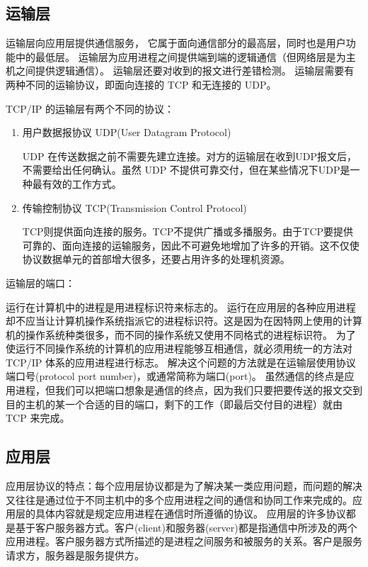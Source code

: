 \subsection{运输层}

运输层向应用层提供通信服务，
它属于面向通信部分的最高层，同时也是用户功能中的最低层。
运输层为应用进程之间提供端到端的逻辑通信（但网络层是为主机之间提供逻辑通信）。
运输层还要对收到的报文进行差错检测。
运输层需要有两种不同的运输协议，即面向连接的 TCP 和无连接的 UDP。

TCP/IP 的运输层有两个不同的协议：

\begin{enumerate}
  \item 用户数据报协议 UDP(User Datagram Protocol)

UDP 在传送数据之前不需要先建立连接。对方的运输层在收到UDP报文后，不需要给出任何确认。虽然 UDP 不提供可靠交付，但在某些情况下UDP是一种最有效的工作方式。



  \item 传输控制协议 TCP(Transmission Control Protocol)

TCP则提供面向连接的服务。TCP不提供广播或多播服务。由于TCP要提供可靠的、面向连接的运输服务，因此不可避免地增加了许多的开销。这不仅使协议数据单元的首部增大很多，还要占用许多的处理机资源。

\end{enumerate}




运输层的端口：

运行在计算机中的进程是用进程标识符来标志的。
运行在应用层的各种应用进程却不应当让计算机操作系统指派它的进程标识符。这是因为在因特网上使用的计算机的操作系统种类很多，而不同的操作系统又使用不同格式的进程标识符。
为了使运行不同操作系统的计算机的应用进程能够互相通信，就必须用统一的方法对 TCP/IP 体系的应用进程进行标志。
解决这个问题的方法就是在运输层使用协议端口号(protocol port number)，或通常简称为端口(port)。
虽然通信的终点是应用进程，但我们可以把端口想象是通信的终点，因为我们只要把要传送的报文交到目的主机的某一个合适的目的端口，剩下的工作（即最后交付目的进程）就由 TCP 来完成。



\subsection{应用层}

应用层协议的特点：每个应用层协议都是为了解决某一类应用问题，而问题的解决又往往是通过位于不同主机中的多个应用进程之间的通信和协同工作来完成的。应用层的具体内容就是规定应用进程在通信时所遵循的协议。
应用层的许多协议都是基于客户服务器方式。客户(client)和服务器(server)都是指通信中所涉及的两个应用进程。客户服务器方式所描述的是进程之间服务和被服务的关系。客户是服务请求方，服务器是服务提供方。

